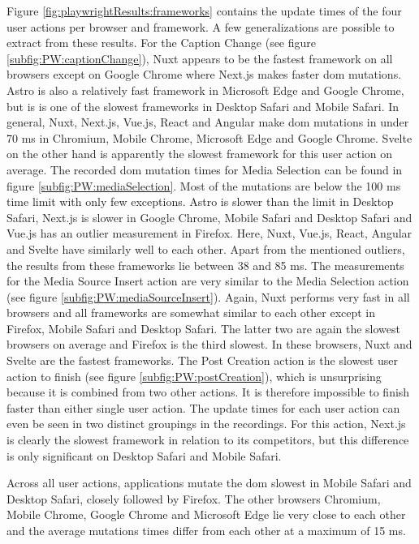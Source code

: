 \documentclass[a4paper, 12pt]{article}
\begin{document}
Figure \ref{fig:playwrightResults:frameworks} contains the update times of the four user actions per browser and framework.
A few generalizations are possible to extract from these results.
For the Caption Change (see figure \ref{subfig:PW:captionChange}), Nuxt appears to be the fastest framework on all browsers except on Google Chrome where Next.js makes faster \acrshort{dom} mutations.
Astro is also a relatively fast framework in Microsoft Edge and Google Chrome, but is is one of the slowest frameworks in Desktop Safari and Mobile Safari.
In general, Nuxt, Next.js, Vue.js, React and Angular make \acrshort{dom} mutations in under 70 ms in Chromium, Mobile Chrome, Microsoft Edge and Google Chrome.
Svelte on the other hand is apparently the slowest framework for this user action on average.
The recorded \acrshort{dom} mutation times for Media Selection can be found in figure \ref{subfig:PW:mediaSelection}.
Most of the mutations are below the 100 ms time limit with only few exceptions.
Astro is slower than the limit in Desktop Safari, Next.js is slower in Google Chrome, Mobile Safari and Desktop Safari and Vue.js has an outlier measurement in Firefox.
Here, Nuxt, Vue.js, React, Angular and Svelte have similarly well to each other.
Apart from the mentioned outliers, the results from these frameworks lie between 38 and 85 ms.
The measurements for the Media Source Insert action are very similar to the Media Selection action (see figure \ref{subfig:PW:mediaSourceInsert}).
Again, Nuxt performs very fast in all browsers and all frameworks are somewhat similar to each other except in Firefox, Mobile Safari and Desktop Safari.
The latter two are again the slowest browsers on average and Firefox is the third slowest.
In these browsers, Nuxt and Svelte are the fastest frameworks.
The Post Creation action is the slowest user action to finish (see figure \ref{subfig:PW:postCreation}), which is unsurprising because it is combined from two other actions.
It is therefore impossible to finish faster than either single user action.
The update times for each user action can even be seen in two distinct groupings in the recordings.
For this action, Next.js is clearly the slowest framework in relation to its competitors, but this difference is only significant on Desktop Safari and Mobile Safari.

Across all user actions, applications mutate the \acrshort{dom} slowest in Mobile Safari and Desktop Safari, closely followed by Firefox.
The other browsers Chromium, Mobile Chrome, Google Chrome and Microsoft Edge lie very close to each other and the average mutations times differ from each other at a maximum of 15 ms.
\end{document}
